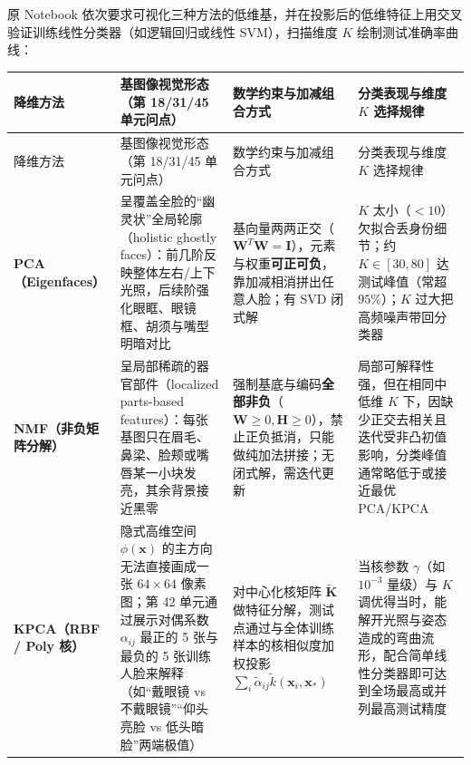 
原 Notebook 依次要求可视化三种方法的低维基，并在投影后的低维特征上用交叉验证训练线性分类器（如逻辑回归或线性 SVM），扫描维度 $K$ 绘制测试准确率曲线：

\begingroup\small\setlength{\tabcolsep}{3pt}\renewcommand{\arraystretch}{1.24}
\begin{longtable}{@{}>{\raggedright\arraybackslash}p{}>{\raggedright\arraybackslash}p{}>{\raggedright\arraybackslash}p{}>{\raggedright\arraybackslash}p{}@{}}
\toprule
降维方法 & 基图像视觉形态（第 18/31/45 单元问点） & 数学约束与加减组合方式 & 分类表现与维度 $K$ 选择规律 \\
\midrule\endfirsthead
降维方法 & 基图像视觉形态（第 18/31/45 单元问点） & 数学约束与加减组合方式 & 分类表现与维度 $K$ 选择规律 \\
\midrule\endhead
\bottomrule\endfoot
\textbf{PCA（Eigenfaces）} & 呈覆盖全脸的“幽灵状”全局轮廓（holistic ghostly faces）：前几阶反映整体左右/上下光照，后续阶强化眼眶、眼镜框、胡须与嘴型明暗对比 & 基向量两两正交（$\mathbf{W}^T\mathbf{W}=\mathbf{I}$），元素与权重\textbf{可正可负}，靠加减相消拼出任意人脸；有 SVD 闭式解 & $K$ 太小（$<10$）欠拟合丢身份细节；约 $K \in [30, 80]$ 达测试峰值（常超 $95\%$）；$K$ 过大把高频噪声带回分类器 \\
\textbf{NMF（非负矩阵分解）} & 呈局部稀疏的器官部件（localized parts-based features）：每张基图只在眉毛、鼻梁、脸颊或嘴唇某一小块发亮，其余背景接近黑零 & 强制基底与编码\textbf{全部非负}（$\mathbf{W}\ge 0, \mathbf{H}\ge 0$），禁止正负抵消，只能做纯加法拼接；无闭式解，需迭代更新 & 局部可解释性强，但在相同中低维 $K$ 下，因缺少正交去相关且迭代受非凸初值影响，分类峰值通常略低于或接近最优 PCA/KPCA \\
\textbf{KPCA（RBF / Poly 核）} & 隐式高维空间 $\phi(\mathbf{x})$ 的主方向无法直接画成一张 $64\times 64$ 像素图；第 42 单元通过展示对偶系数 $\alpha_{ij}$ 最正的 5 张与最负的 5 张训练人脸来解释（如“戴眼镜 vs 不戴眼镜”“仰头亮脸 vs 低头暗脸”两端极值） & 对中心化核矩阵 $\tilde{\mathbf{K}}$ 做特征分解，测试点通过与全体训练样本的核相似度加权投影 $\sum_i \tilde{\alpha}_{ij}\tilde{k}(\mathbf{x}_i, \mathbf{x}_*)$ & 当核参数 $\gamma$（如 $10^{-3}$ 量级）与 $K$ 调优得当时，能解开光照与姿态造成的弯曲流形，配合简单线性分类器即可达到全场最高或并列最高测试精度 \\
\end{longtable}\endgroup

